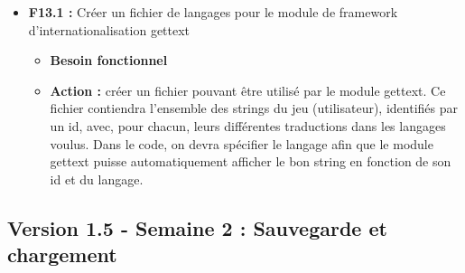 \documentclass{article}
\begin{document}
\begin{itemize}
\begin{itemize}
\begin{itemize}
\begin{itemize}
                \item \textbf{Actions :} Requiert une fonction is\_game\_over(board) → (boolean, winner). Renvoie True si la partie est finie, False sinon. Si fin de partie il y a, la fonction renvoie aussi le joueur gagnant. Elle appelle la détection de connexion définie dans le module bitboard (\textbf{F43}).
                \item \textbf{Tests :} Vérifier que la fonction renvoie True et le joueur gagnant si on lui passe un plateau gagnant en paramètre et qu’elle renvoie False pour un plateau quelconque.
            \end{itemize}
            \smallskip
            \item \textbf{F37.2} Affichage de la fin de partie
            \begin{itemize}
                \item \textbf{Prérequis :} État du plateau, joueur courant (\textbf{F44}).
                \item \textbf{Actions :} Écrire le gagnant sur la sortie standard lorsque la partie est terminée.
                \item \textbf{Tests :} Lire la sortie standard et vérifier que le message soit correct.
            \end{itemize}
        \end{itemize}
    \end{itemize}
\bigskip
    \item \textbf{F13.1 :} Créer un fichier de langages pour le module de framework d’internationalisation gettext
    \begin{itemize}
        \item \textbf{Besoin fonctionnel}
        \item \textbf{Action :} créer un fichier pouvant être utilisé par le module gettext. Ce fichier contiendra l’ensemble des strings du jeu (utilisateur), identifiés par un id, avec, pour chacun, leurs différentes traductions dans les langages voulus. Dans le code, on devra spécifier le langage afin que le module gettext puisse automatiquement afficher le bon string en fonction de son id et du langage.
    \end{itemize}
\end{itemize}

\subsection{Version 1.5 - Semaine 2 : Sauvegarde et chargement}
\end{document}
